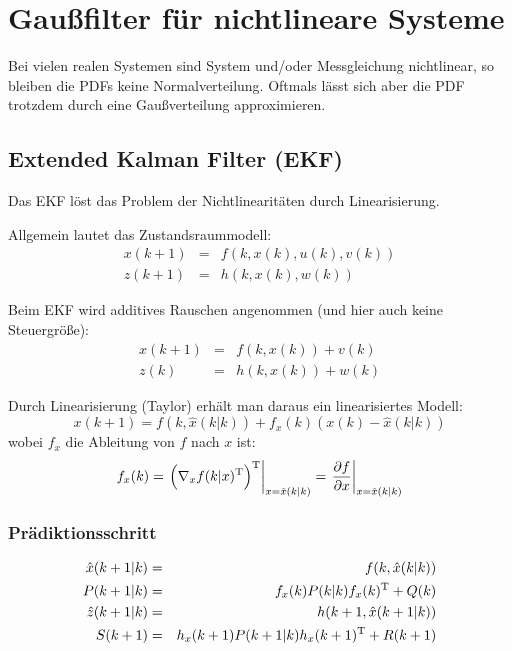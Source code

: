 \chapter{Gaußfilter für nichtlineare Systeme}
Bei vielen realen Systemen sind System und/oder Messgleichung nichtlinear, so bleiben die PDFs keine Normalverteilung. 
Oftmals lässt sich aber die PDF trotzdem durch eine Gaußverteilung approximieren.

\section{Extended Kalman Filter (EKF)}
Das EKF löst das Problem der Nichtlinearitäten durch Linearisierung.

Allgemein lautet das Zustandsraummodell:
\begin{eqnarray*}
    x(k+1) &=& f(k, x(k), u(k), v(k)) \\
    z(k+1) &=& h(k, x(k), w(k))
\end{eqnarray*}

Beim EKF wird additives Rauschen angenommen (und hier auch keine Steuergröße):
\begin{eqnarray*}
    x(k+1) &=& f(k, x(k)) + v(k) \\
    z(k) &=& h(k, x(k)) + w(k)
\end{eqnarray*}

Durch Linearisierung (Taylor) erhält man daraus ein linearisiertes Modell:
\begin{equation*}
    x(k+1) = f(k, \hat{x}(k|k)) + f_x(k) \left(x(k) - \hat{x}(k|k)\right)
\end{equation*}
wobei $f_x$ die Ableitung von $f$ nach $x$ ist:
\begin{equation*}
    f_x(k) = \left. \left( \nabla_x f(k|x)^\text{T} \right)^\text{T} \right|_{x=\hat{x}(k|k)}
        = \left. \frac{\partial f}{\partial x} \right|_{x=\hat{x}(k|k)}
\end{equation*}

\subsection{Prädiktionsschritt}
\begin{eqnarray*}
    \hat{x}(k+1|k) &=& f(k, \hat{x}(k|k)) \\
    P(k+1|k) &=& f_x(k) P(k|k) f_x(k)^\text{T} + Q(k) \\
    \hat{z}(k+1|k) &=& h(k+1, \hat{x}(k+1|k)) \\
    S(k+1) &=& h_x(k+1) P(k+1|k) h_x(k+1)^\text{T} + R(k+1)
\end{eqnarray*}

